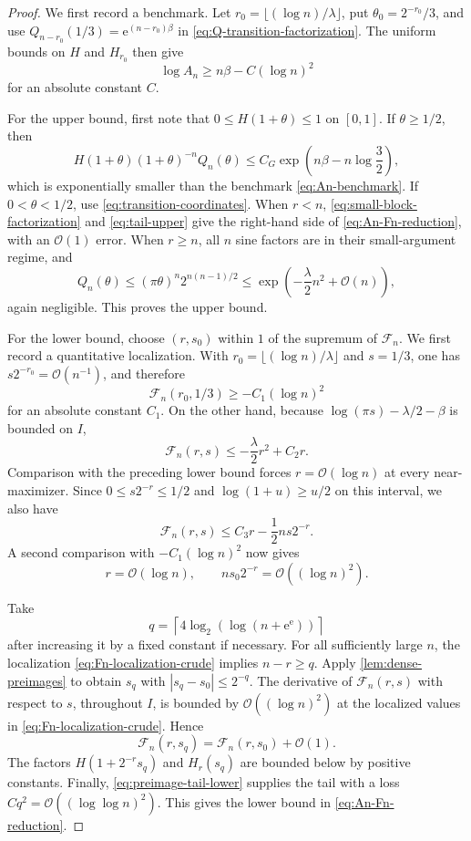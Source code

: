 \documentclass[11pt,oneside]{article}
\theoremstyle{definition}
\theoremstyle{remark}
\newcommand{\e}{\mathrm e}
\newcommand{\bigO}{\mathcal O}
\begin{document}
\begin{proof}
We first record a benchmark.  Let
\(r_0=\lfloor(\log n)/\lambda\rfloor\), put
\(\theta_0=2^{-r_0}/3\), and use
\(Q_{n-r_0}(1/3)=\e^{(n-r_0)\beta}\) in
\eqref{eq:Q-transition-factorization}.  The uniform bounds on \(H\) and
\(H_{r_0}\) then give
\begin{equation}
 \log A_n\ge n\beta-C(\log n)^2
 \label{eq:An-benchmark}
\end{equation}
for an absolute constant \(C\).

For the upper bound, first note that \(0\le H(1+\theta)\le1\) on
\([0,1]\).  If \(\theta\ge1/2\), then
\[
 H(1+\theta)(1+\theta)^{-n}Q_n(\theta)
 \le C_G\exp\!\left(n\beta-n\log\frac32\right),
\]
which is exponentially smaller than the benchmark \eqref{eq:An-benchmark}.  If
\(0<\theta<1/2\), use \eqref{eq:transition-coordinates}.  When \(r<n\),
\eqref{eq:small-block-factorization} and \eqref{eq:tail-upper} give the
right-hand side of \eqref{eq:An-Fn-reduction}, with an \(\bigO(1)\) error.
When \(r\ge n\), all \(n\) sine factors are in their small-argument regime,
and
\[
 Q_n(\theta)\le(\pi\theta)^n2^{n(n-1)/2}
 \le\exp\!\left(-\frac\lambda2n^2+\bigO(n)\right),
\]
again negligible.  This proves the upper bound.

For the lower bound, choose \((r,s_0)\) within \(1\) of the supremum of
\(\mathcal F_n\).  We first record a quantitative localization.  With
\(r_0=\lfloor(\log n)/\lambda\rfloor\) and \(s=1/3\), one has
\(s2^{-r_0}=\bigO(n^{-1})\), and therefore
\[
 \mathcal F_n(r_0,1/3)\ge-C_1(\log n)^2
\]
for an absolute constant \(C_1\).  On the other hand, because
\(\log(\pi s)-\lambda/2-\beta\) is bounded on \(I\),
\[
 \mathcal F_n(r,s)\le-\frac\lambda2r^2+C_2r.
\]
Comparison with the preceding lower bound forces \(r=\bigO(\log n)\) at every
near-maximizer.  Since \(0\le s2^{-r}\le1/2\) and
\(\log(1+u)\ge u/2\) on this interval, we also have
\[
 \mathcal F_n(r,s)
 \le C_3r-\frac12ns2^{-r}.
\]
A second comparison with \(-C_1(\log n)^2\) now gives
\begin{equation}
 r=\bigO(\log n),
 \qquad
 n s_0 2^{-r}=\bigO((\log n)^2).
 \label{eq:Fn-localization-crude}
\end{equation}

Take
\[
 q=\left\lceil4\log_2(\log(n+\e^\e))\right\rceil
\]
after increasing it by a fixed constant if necessary.  For all sufficiently large
\(n\), the localization \eqref{eq:Fn-localization-crude} implies
\(n-r\ge q\).  Apply \cref{lem:dense-preimages} to obtain \(s_q\) with
\(|s_q-s_0|\le2^{-q}\).  The derivative of \(\mathcal F_n(r,s)\) with
respect to \(s\), throughout \(I\), is bounded by \(\bigO((\log n)^2)\) at
the localized values in \eqref{eq:Fn-localization-crude}.  Hence
\[
 \mathcal F_n(r,s_q)=\mathcal F_n(r,s_0)+\bigO(1).
\]
The factors \(H(1+2^{-r}s_q)\) and \(H_r(s_q)\) are bounded below by positive
constants.  Finally, \eqref{eq:preimage-tail-lower} supplies the tail with a
loss \(Cq^2=\bigO((\log\log n)^2)\).  This gives the lower bound in
\eqref{eq:An-Fn-reduction}.
\end{proof}
\end{document}

